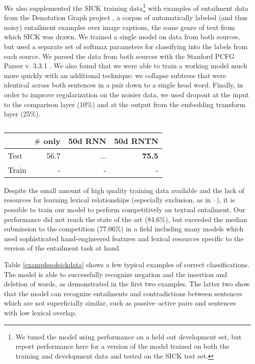 We also supplemented the SICK training data\footnote{We tuned the model using performance on a held out development set, but report performance here for a version of the model trained on both the training and development data and tested on the SICK test set.} with  examples of entailment data from the Denotation Graph project \cite{hodoshimage}, a corpus of automatically labeled (and thus noisy) entailment examples over image captions, the same genre of text from which SICK was drawn. We trained a single model on data from both sources, but used a separate set of softmax parameters for classifying into the labels from each source. We parsed the data from both sources with the Stanford PCFG Parser v. 3.3.1 \cite{klein2003accurate}. We also found that we were able to train a working model much more quickly with an additional technique: we collapse subtrees that were identical across both sentences in a pair down to a single head word. Finally, in order to improve regularization on the noisier data, we used dropout \cite{hinton2012improving} at the input to the comparison layer (10\%) and at the output from the embedding transform layer (25\%). 


\begin{table}[tp]
  \centering \small
  \begin{tabular}{ l r@{ \ } r@{ \ } r@{ \ } }
    \toprule
    ~&\multicolumn{1}{c}{$\mathbin{\#}$ only} & \multicolumn{1}{c}{50d RNN}  & \multicolumn{1}{c}{50d RNTN}\\
    \midrule
    Test & 56.7 &	...& \textbf{75.5} \\
    Train &- &- &-  \\
    \bottomrule
  \end{tabular}
  \caption{}
  \label{sresultstable}
\end{table} 

Despite the small amount of high quality training data available and the lack of resources for learning lexical relationships (especially exclusion, as in --), it is possible to train our model to perform competitively on textual entailment. Our performance did not reach the state of the art (84.6\%), but exceeded the median submission to the competition (77.06\%) in a field including many models which used sophisticated hand-engineered features and lexical resources specific to the version of the entailment task at hand.

Table \ref{examplesofsickdata} shows a few typical examples of correct classifications. The model is able to successfully recognize negation and the insertion and deletion of words, as demonstrated in the first two examples. The latter two show that the model can recognize entailments and contradictions between sentences which are not superficially similar, such as passive--active pairs and sentences with low lexical overlap.
